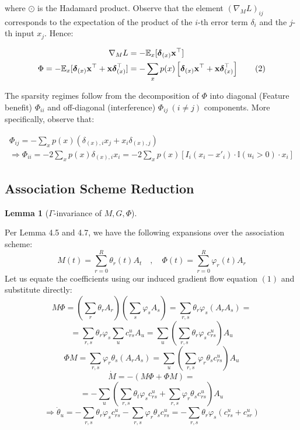\documentclass{article}
\theoremstyle{plain}
\newtheorem{lemma}{Lemma}[section]
\numberwithin{equation}{section}
\theoremstyle{definition}
\theoremstyle{remark}
\begin{document}
where $\odot$ is the Hadamard product. Observe that the element $(\nabla_M L)_{ij}$ corresponds to the expectation of the product of the $i$-th error term $\delta_i$ and the $j$-th input $x_j$. Hence:

\begin{align}
\nabla_M L &= -\mathbb{E}_x [\boldsymbol{\delta}_{(x)}\mathbf{x}^\top] \notag \\
\Phi = -\mathbb{E}_x [\boldsymbol{\delta}_{(x)}\mathbf{x}^\top + \mathbf{x}\boldsymbol{\delta}_{(x)}^\top] &= -\sum_{x} p(x) \left[ \boldsymbol{\delta}_{(x)}\mathbf{x}^\top + \mathbf{x}\boldsymbol{\delta}_{(x)}^\top \right] \tag{2}
\end{align}

The sparsity regimes follow from the decomposition of $\Phi$ into diagonal (Feature benefit) $\Phi_{ii}$ and off-diagonal (interference) $\Phi_{ij}~(i \neq j)$ components. More specifically, observe that:

\begin{gather*}
\Phi_{ij} = -\sum_{x} p(x) (\delta_{(x),i}x_j + x_i\delta_{(x),j}) \\
\Rightarrow \Phi_{ii} = -2\sum_{x} p(x) \delta_{(x),i}x_i = -2\sum_{x} p(x) \left[ I_i(x_i - x'_i) \cdot \mathbb{I}(u_i > 0) \cdot x_i \right]
\end{gather*}


\subsection{Association Scheme Reduction}
\label{appendix:association_scheme}
\begin{lemma}[$\Gamma$-invariance of $M, G, \Phi$]
\end{lemma}
\noindent Per Lemma 4.5 and 4.7, we have the following expansions over the association scheme: 
$$M(t) = \sum_{r=0}^R \theta_r(t) A_t\quad , \quad \Phi(t) = \sum_{r=0}^R \varphi_r(t)A_r$$ 
Let us equate the coefficients using our induced gradient flow equation $(1)$ and substitute directly: 
$$M\Phi = \left(\sum_r \theta_r A_r\right)\left(\sum_s \varphi_s A_s\right) = \sum_{r, s}\theta_r\varphi_s(A_rA_s) = $$
$$=\sum_{r, s}\theta_r\varphi_s \sum_u c_{rs}^u A_u = \sum_u\left(\sum_{r, s} \theta_r \varphi_s c_{rs}^u\right)A_u$$
$$\Phi M = \sum_{r, s}\varphi_r\theta_s(A_rA_s) = \sum_{u}\left(\sum_{r, s}\varphi_r\theta_sc_{rs}^u\right)A_u$$
$$ \dot M = -(M\Phi+\Phi M) =$$
$$=-\sum_u \left(\sum_{r, s}\theta_t\varphi_sc_{rs}^u + \sum_{r, s}\varphi_r\theta_sc_{rs}^u\right)A_u$$
\begin{equation}\Rightarrow \dot\theta_u = -\sum_{r, s}\theta_r \varphi_sc_{rs}^u - \sum_{r, s}\varphi_r\theta_sc_{rs}^u = -\sum_{r, s}\theta_r\varphi_s(c_{rs}^u + c_{sr}^u)\end{equation}
\end{document}
